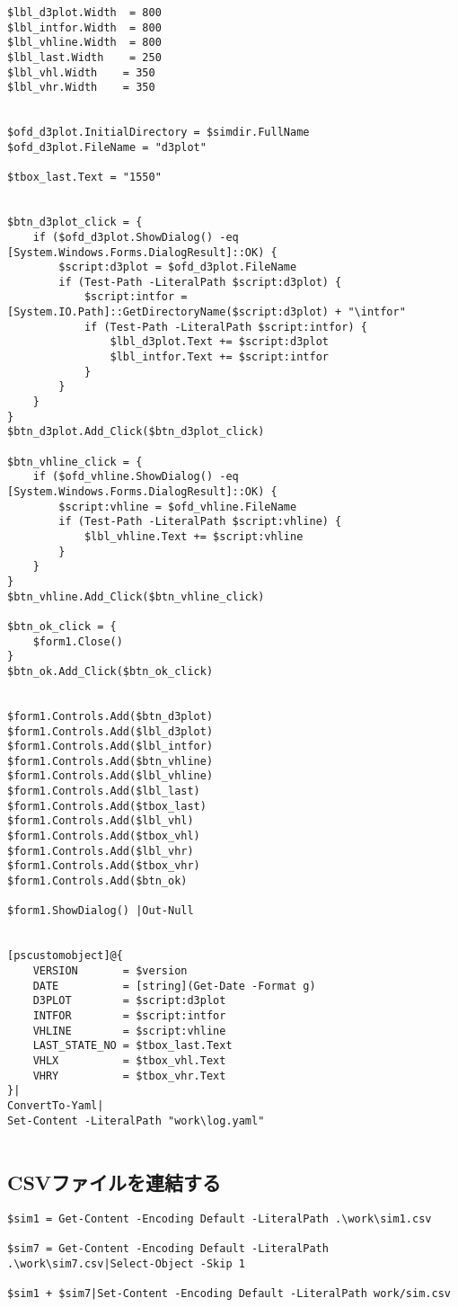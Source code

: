 \documentclass[dvipdfmx]{jsarticle}
\begin{document}
\begin{verbatim}
$lbl_d3plot.Width  = 800
$lbl_intfor.Width  = 800
$lbl_vhline.Width  = 800
$lbl_last.Width    = 250
$lbl_vhl.Width    = 350
$lbl_vhr.Width    = 350


$ofd_d3plot.InitialDirectory = $simdir.FullName
$ofd_d3plot.FileName = "d3plot"

$tbox_last.Text = "1550"


$btn_d3plot_click = {
    if ($ofd_d3plot.ShowDialog() -eq [System.Windows.Forms.DialogResult]::OK) {
        $script:d3plot = $ofd_d3plot.FileName
        if (Test-Path -LiteralPath $script:d3plot) {
            $script:intfor = [System.IO.Path]::GetDirectoryName($script:d3plot) + "\intfor"
            if (Test-Path -LiteralPath $script:intfor) {
                $lbl_d3plot.Text += $script:d3plot
                $lbl_intfor.Text += $script:intfor
            }
        }
    }
}
$btn_d3plot.Add_Click($btn_d3plot_click)

$btn_vhline_click = {
    if ($ofd_vhline.ShowDialog() -eq [System.Windows.Forms.DialogResult]::OK) {
        $script:vhline = $ofd_vhline.FileName
        if (Test-Path -LiteralPath $script:vhline) {
            $lbl_vhline.Text += $script:vhline
        }
    }
}
$btn_vhline.Add_Click($btn_vhline_click)

$btn_ok_click = {
    $form1.Close()
}
$btn_ok.Add_Click($btn_ok_click)


$form1.Controls.Add($btn_d3plot)
$form1.Controls.Add($lbl_d3plot)
$form1.Controls.Add($lbl_intfor)
$form1.Controls.Add($btn_vhline)
$form1.Controls.Add($lbl_vhline)
$form1.Controls.Add($lbl_last)
$form1.Controls.Add($tbox_last)
$form1.Controls.Add($lbl_vhl)
$form1.Controls.Add($tbox_vhl)
$form1.Controls.Add($lbl_vhr)
$form1.Controls.Add($tbox_vhr)
$form1.Controls.Add($btn_ok)

$form1.ShowDialog() |Out-Null


[pscustomobject]@{
    VERSION       = $version
    DATE          = [string](Get-Date -Format g)
    D3PLOT        = $script:d3plot
    INTFOR        = $script:intfor
    VHLINE        = $script:vhline
    LAST_STATE_NO = $tbox_last.Text
    VHLX          = $tbox_vhl.Text
    VHRY          = $tbox_vhr.Text
}|
ConvertTo-Yaml|
Set-Content -LiteralPath "work\log.yaml"


\end{verbatim}


\subsection{CSVファイルを連結する}

\begin{verbatim}
$sim1 = Get-Content -Encoding Default -LiteralPath .\work\sim1.csv

$sim7 = Get-Content -Encoding Default -LiteralPath .\work\sim7.csv|Select-Object -Skip 1

$sim1 + $sim7|Set-Content -Encoding Default -LiteralPath work/sim.csv

\end{verbatim}
\end{document}
